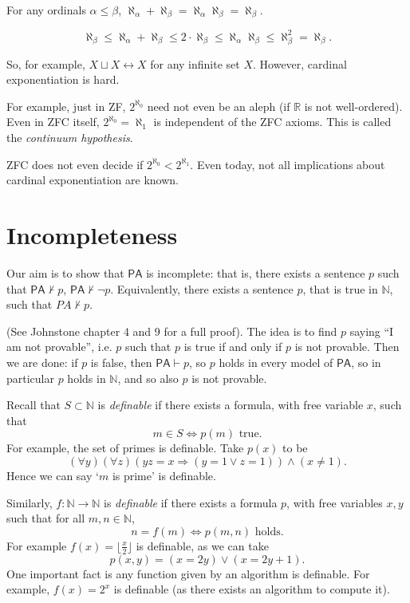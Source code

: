 \documentclass[12pt]{article}
\begin{document}
\begin{corollary}
	For any ordinals $\alpha \le \beta$, $\aleph_\alpha + \aleph_\beta = \aleph_\alpha \aleph_\beta = \aleph_\beta$.
\end{corollary}

\begin{proofbox}
	\[\aleph_\beta \le \aleph_\alpha + \aleph_\beta \le 2 \cdot \aleph_\beta \le \aleph_\alpha \aleph_\beta \le \aleph_\beta^2 = \aleph_\beta.\]
\end{proofbox}

So, for example, $X \sqcup X \leftrightarrow X$ for any infinite set $X$. However, cardinal exponentiation is hard.

For example, just in ZF, $2^{\aleph_0}$ need not even be an aleph (if $\mathbb{R}$ is not well-ordered). Even in ZFC itself, $2^{\aleph_0} = \aleph_1$ is independent of the ZFC axioms. This is called the \emph{continuum hypothesis}.

ZFC does not even decide if $2^{\aleph_0} < 2^{\aleph_1}$. Even today, not all implications about cardinal exponentiation are known.

\newpage

\section{Incompleteness}
\label{sec:incompleteness}

Our aim is to show that $\mathsf{PA}$ is incomplete: that is, there exists a sentence $p$ such that $\mathsf{PA} \not \vdash p$, $\mathsf{PA} \not \vdash \neg p$. Equivalently, there exists a sentence $p$, that is true in $\mathbb{N}$, such that $PA \not \vdash p$.

(See Johnstone chapter 4 and 9 for a full proof). The idea is to find $p$ saying ``I am not provable'', i.e. $p$ such that $p$ is true if and only if $p$ is not provable. Then we are done: if $p$ is false, then $\mathsf{PA} \vdash p$, so $p$ holds in every model of $\mathsf{PA}$, so in particular $p$ holds in $\mathbb{N}$, and so also $p$ is not provable.

Recall that $S \subset \mathbb{N}$ is \emph{definable} if there exists a formula, with free variable $x$, such that
\[
	m \in S \iff p(m) \text{ true}.
\]
For example, the set of primes is definable. Take $p(x)$ to be
\[
	(\forall y)(\forall z)(yz = x \Rightarrow (y = 1 \vee z = 1)) \wedge (x \neq 1).
\]
Hence we can say `$m$ is prime' is definable.

Similarly, $f : \mathbb{N} \to \mathbb{N}$ is \emph{definable} if there exists a formula $p$, with free variables $x, y$ such that for all $m, n \in \mathbb{N}$, 
\[
	n = f(m) \iff p(m, n) \text{ holds}.
\]
For example $f(x) = \lfloor \frac{x}{2} \rfloor$ is definable, as we can take
\[
p(x, y) = (x = 2y) \vee (x = 2y + 1).
\]
One important fact is any function given by an algorithm is definable. For example, $f(x) = 2^{x}$ is definable (as there exists an algorithm to compute it).
\end{document}
